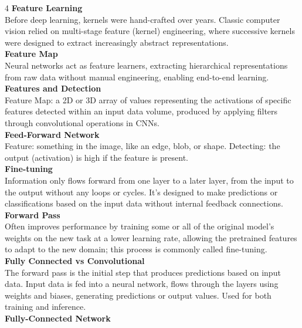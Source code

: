 \documentclass[8pt]{extarticle}
\begin{document}
\begin{multicols}{4}
\vspace{2pt}\textbf{Feature Learning}\\
Before deep learning, kernels were hand-crafted over years. Classic computer vision relied on multi-stage feature (kernel) engineering, where successive kernels were designed to extract increasingly abstract representations.\\
\vspace{2pt}\textbf{Feature Map}\\
Neural networks act as feature learners, extracting hierarchical representations from raw data without manual engineering, enabling end-to-end learning.\\
\vspace{2pt}\textbf{Features and Detection}\\
Feature Map: a 2D or 3D array of values representing the activations of specific features detected within an input data volume, produced by applying filters through convolutional operations in CNNs.\\
\vspace{2pt}\textbf{Feed-Forward Network}\\
Feature: something in the image, like an edge, blob, or shape. Detecting: the output (activation) is high if the feature is present.\\
\vspace{2pt}\textbf{Fine-tuning}\\
Information only flows forward from one layer to a later layer, from the input to the output without any loops or cycles. It's designed to make predictions or classifications based on the input data without internal feedback connections.\\
\vspace{2pt}\textbf{Forward Pass}\\
Often improves performance by training some or all of the original model's weights on the new task at a lower learning rate, allowing the pretrained features to adapt to the new domain; this process is commonly called fine-tuning.\\
\vspace{2pt}\textbf{Fully Connected vs Convolutional}\\
The forward pass is the initial step that produces predictions based on input data. Input data is fed into a neural network, flows through the layers using weights and biases, generating predictions or output values. Used for both training and inference.\\
\vspace{2pt}\textbf{Fully-Connected Network}\\

\end{multicols}
\end{document}
